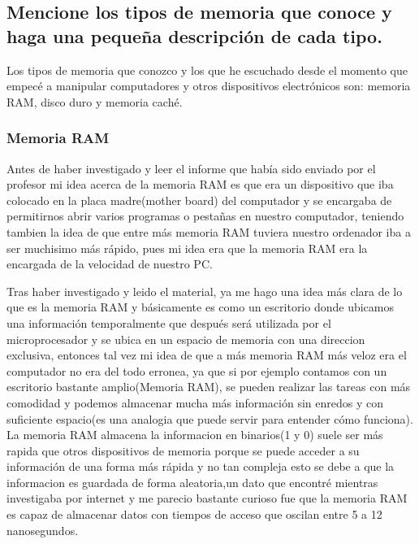 \documentclass{article}
\begin{document}
\subsection{Mencione los tipos de memoria que conoce y haga una pequeña descripción de cada tipo.}
\noindent
Los tipos de memoria que conozco y los que he escuchado desde el momento que empecé a manipular computadores y otros dispositivos electrónicos son: memoria RAM, disco duro y memoria caché.
\subsubsection{Memoria RAM}
\noindent
Antes de haber investigado y leer el informe que había sido enviado por el profesor mi idea acerca de la memoria RAM es que era un dispositivo que iba colocado en la placa madre(mother board) del computador y se encargaba de permitirnos abrir varios programas o pestañas en nuestro computador, teniendo tambien la idea de que entre más memoria RAM tuviera nuestro ordenador iba a ser muchisimo más rápido, pues mi idea era que la memoria RAM era la encargada de la velocidad de nuestro PC.

\vspace{0.5cm}
\noindent
Tras haber investigado y leido el material, ya me hago una idea más clara de lo que es la memoria RAM y básicamente es como un escritorio donde ubicamos una información temporalmente que después será utilizada por el microprocesador y se ubica en un espacio de memoria con una direccion exclusiva, entonces tal vez mi idea de que a más memoria RAM más veloz era el computador no era del todo erronea, ya que si por ejemplo contamos con un escritorio bastante amplio(Memoria RAM), se pueden realizar las tareas con más comodidad y podemos almacenar mucha más información sin enredos y con suficiente espacio(es una analogia que puede servir para entender cómo funciona). La memoria RAM almacena la informacion en binarios(1 y 0) suele ser más rapida que otros dispositivos de memoria porque se puede acceder a su información de una forma más rápida y no tan compleja esto se debe a que la informacion es guardada de forma aleatoria,un dato que encontré mientras investigaba por internet y me parecio bastante curioso fue que la memoria RAM es capaz de almacenar datos con tiempos de acceso que oscilan entre 5 a 12 nanosegundos. \cite{geniolandia}
\end{document}
